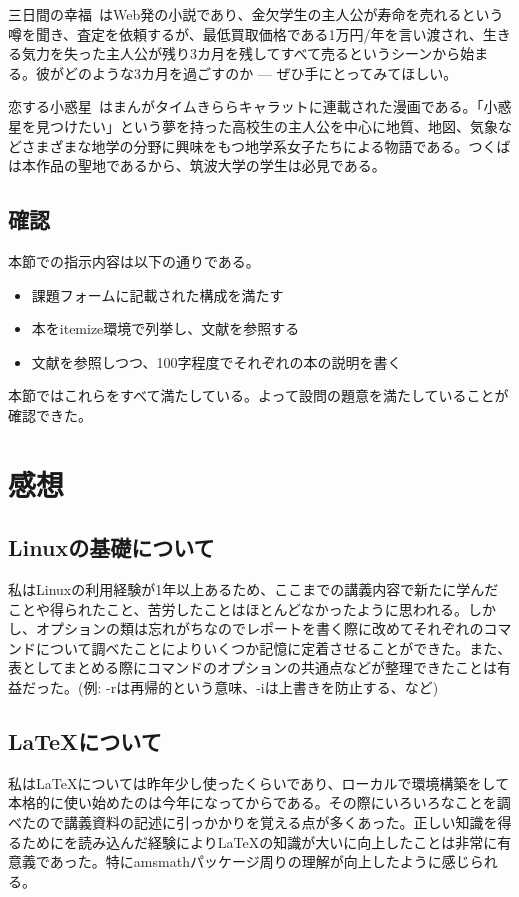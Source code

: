 \documentclass[dvipdfmx,12pt,a4j]{jarticle}
\begin{document}
三日間の幸福~\cite{koufuku}はWeb発の小説であり、金欠学生の主人公が寿命を売れるという噂を聞き、査定を依頼するが、最低買取価格である1万円/年を言い渡され、生きる気力を失った主人公が残り3カ月を残してすべて売るというシーンから始まる。彼がどのような3カ月を過ごすのか — ぜひ手にとってみてほしい。

恋する小惑星~\cite{koiasu}はまんがタイムきららキャラットに連載された漫画である。「小惑星を見つけたい」という夢を持った高校生の主人公を中心に地質、地図、気象などさまざまな地学の分野に興味をもつ地学系女子たちによる物語である。つくばは本作品の聖地であるから、筑波大学の学生は必見である。
\subsection{確認}
本節での指示内容は以下の通りである。
\begin{itemize}
  \item 課題フォームに記載された構成を満たす
  \item 本をitemize環境で列挙し、文献を参照する
  \item 文献を参照しつつ、100字程度でそれぞれの本の説明を書く
\end{itemize}
本節ではこれらをすべて満たしている。よって設問の題意を満たしていることが確認できた。

\section{感想}
\subsection{Linuxの基礎について}
私はLinuxの利用経験が1年以上あるため、ここまでの講義内容で新たに学んだことや得られたこと、苦労したことはほとんどなかったように思われる。しかし、オプションの類は忘れがちなのでレポートを書く際に改めてそれぞれのコマンドについて調べたことによりいくつか記憶に定着させることができた。また、表としてまとめる際にコマンドのオプションの共通点などが整理できたことは有益だった。(例: -rは再帰的という意味、-iは上書きを防止する、など)

\subsection{\LaTeX について}
私は\LaTeX については昨年少し使ったくらいであり、ローカルで環境構築をして本格的に使い始めたのは今年になってからである。その際にいろいろなことを調べたので講義資料の記述に引っかかりを覚える点が多くあった。正しい知識を得るために\cite{bibunsho}を読み込んだ経験により\LaTeX の知識が大いに向上したことは非常に有意義であった。特にamsmathパッケージ周りの理解が向上したように感じられる。
\end{document}
